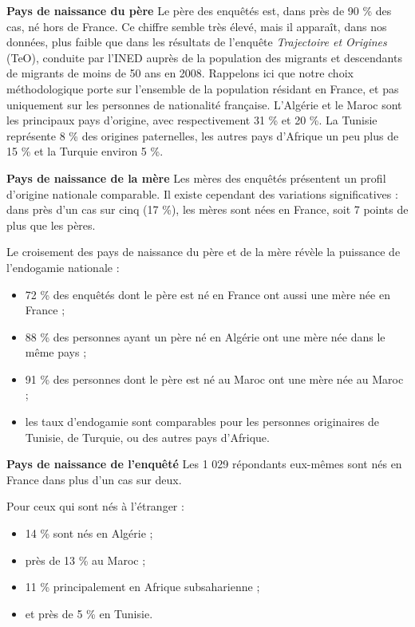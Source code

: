 \textbf{Pays de naissance du père}
Le père des enquêtés est, dans près de 90 \% des cas, né hors de France.
Ce chiffre semble très élevé, mais il apparaît, dans nos données, plus
faible que dans les résultats de l'enquête \emph{Trajectoire et
Origines} (TeO), conduite par l'INED auprès de la population des
migrants et descendants de migrants de moins de 50 ans en 2008.
Rappelons ici que notre choix méthodologique porte sur l'ensemble de la
population résidant en France, et pas uniquement sur les personnes de
nationalité française. L'Algérie et le Maroc sont les principaux pays
d'origine, avec respectivement 31 \% et 20 \%. La Tunisie représente 8
\% des origines paternelles, les autres pays d'Afrique un peu plus de 15
\% et la Turquie environ 5 \%.


\textbf{Pays de naissance de la mère}
Les mères des enquêtés présentent un profil d'origine nationale
comparable. Il existe cependant des variations significatives : dans
près d'un cas sur cinq (17 \%), les mères sont nées en France, soit 7
points de plus que les pères.

Le croisement des pays de naissance du père et de la mère révèle la
puissance de l'endogamie nationale :


\begin{itemize}
\item
  
  72 \% des enquêtés dont le père est né en France ont aussi une mère
  née en France ;
  
\item
  
  88 \% des personnes ayant un père né en Algérie ont une mère née dans
  le même pays ;
  
\item
  
  91 \% des personnes dont le père est né au Maroc ont une mère née au
  Maroc ;
  
\item
  
  les taux d'endogamie sont comparables pour les personnes originaires
  de Tunisie, de Turquie, ou des autres pays d'Afrique.
  
\end{itemize}

\textbf{Pays de naissance de l'enquêté}
Les 1 029 répondants eux-mêmes sont nés en France dans plus d'un cas sur
deux.

Pour ceux qui sont nés à l'étranger :


\begin{itemize}
\item
  
  14 \% sont nés en Algérie ;
  
\item
  
  près de 13 \% au Maroc ;
  
\item
  
  11 \% principalement en Afrique subsaharienne ;
  
\item
  
  et près de 5 \% en Tunisie.
  
\end{itemize}
